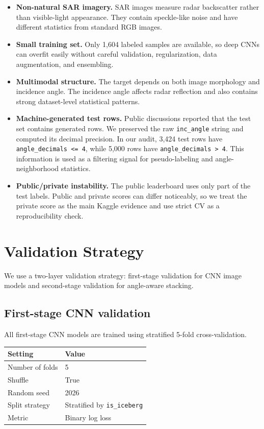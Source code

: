 \documentclass[11pt]{article}
\begin{document}
\begin{itemize}
  \item \textbf{Non-natural SAR imagery.} SAR images measure radar backscatter rather than visible-light appearance. They contain speckle-like noise and have different statistics from standard RGB images.
  \item \textbf{Small training set.} Only 1,604 labeled samples are available, so deep CNNs can overfit easily without careful validation, regularization, data augmentation, and ensembling.
  \item \textbf{Multimodal structure.} The target depends on both image morphology and incidence angle. The incidence angle affects radar reflection and also contains strong dataset-level statistical patterns.
  \item \textbf{Machine-generated test rows.} Public discussions reported that the test set contains generated rows. We preserved the raw \texttt{inc\_angle} string and computed its decimal precision. In our audit, 3,424 test rows have \texttt{angle\_decimals <= 4}, while 5,000 rows have \texttt{angle\_decimals > 4}. This information is used as a filtering signal for pseudo-labeling and angle-neighborhood statistics.
  \item \textbf{Public/private instability.} The public leaderboard uses only part of the test labels. Public and private scores can differ noticeably, so we treat the private score as the main Kaggle evidence and use strict CV as a reproducibility check.
\end{itemize}

\section{Validation Strategy}

We use a two-layer validation strategy: first-stage validation for CNN image models and second-stage validation for angle-aware stacking.

\subsection{First-stage CNN validation}

All first-stage CNN models are trained using stratified 5-fold cross-validation.

\begin{center}
\begin{tabular}{ll}
\toprule
Setting & Value \\
\midrule
Number of folds & 5 \\
Shuffle & True \\
Random seed & 2026 \\
Split strategy & Stratified by \texttt{is\_iceberg} \\
Metric & Binary log loss \\
\bottomrule
\end{tabular}
\end{center}
\end{document}
